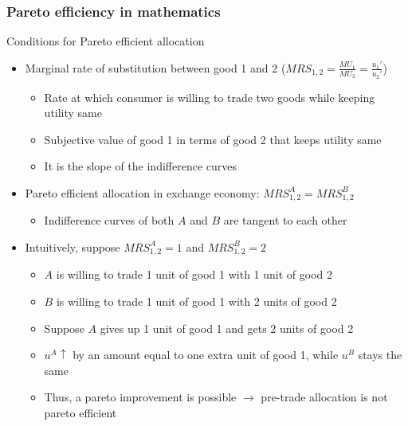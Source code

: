 \documentclass[aspectratio=169]{beamer}
\begin{document}
\begin{frame}
\frametitle{Pareto efficiency in mathematics}
Conditions for Pareto efficient allocation 
\begin{itemize}\setlength\itemsep{3pt}
\item Marginal rate of substitution between good 1 and 2 ($MRS_{1,2} = \frac{MU_1}{MU_2}=\frac{u_1'}{u_2'}$) 
\begin{itemize}\setlength\itemsep{3pt}
\item Rate at which consumer is willing to trade two goods while keeping utility same
\item Subjective value of good 1 in terms of good 2 that keeps utility same
\item It is the slope of the indifference curves
\end{itemize}
\item Pareto efficient allocation in exchange economy: $MRS_{1,2}^A=MRS_{1,2}^B$
\begin{itemize}\setlength\itemsep{3pt}
\item Indifference curves of both $A$ and $B$ are tangent to each other
\end{itemize}
\item Intuitively, suppose $MRS_{1,2}^A=1$ and $MRS_{1,2}^B=2$
\begin{itemize}\setlength\itemsep{3pt}
\item $A$ is willing to trade 1 unit of good 1 with 1 unit of good 2 
\item $B$ is willing to trade 1 unit of good 1 with 2 units of good 2 
\item Suppose $A$ gives up 1 unit of good 1 and gets 2 units of good 2
 \item $u^A \uparrow$ by an amount equal to one extra unit 
  of good 1, while $u^B$ stays the same
\item Thus, a pareto improvement is possible $\to$ pre-trade allocation is not pareto efficient
\end{itemize}
\end{itemize}
\end{frame}
\end{document}
